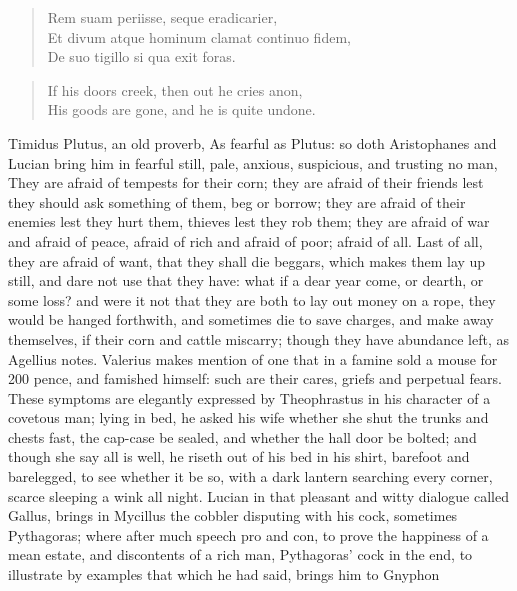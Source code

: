 {\begin{verse}
\textlatin{Rem suam periisse, seque eradicarier},\\
\textlatin{Et divum atque hominum clamat continuo fidem},\\
\textlatin{De suo tigillo si qua exit foras}.
\end{verse}

\begin{verse}
If his doors creek, then out he cries anon,\\
His goods are gone, and he is quite undone.
\end{verse}

Timidus Plutus, an old proverb, As fearful as Plutus: so doth
Aristophanes and Lucian bring him in fearful still, pale, anxious,
suspicious, and trusting no man, They are afraid of tempests for
their corn; they are afraid of their friends lest they should ask
something of them, beg or borrow; they are afraid of their enemies lest
they hurt them, thieves lest they rob them; they are afraid of war and
afraid of peace, afraid of rich and afraid of poor; afraid of all. Last
of all, they are afraid of want, that they shall die beggars, which
makes them lay up still, and dare not use that they have: what if a
dear year come, or dearth, or some loss? and were it not that they are
both to lay out money on a rope, they would be hanged forthwith,
and sometimes die to save charges, and make away themselves, if their
corn and cattle miscarry; though they have abundance left, as
Agellius notes. Valerius makes mention of one that in a
famine sold a mouse for 200 pence, and famished himself: such are their
cares, griefs and perpetual fears. These symptoms are elegantly
expressed by Theophrastus in his character of a covetous man;
lying in bed, he asked his wife whether she shut the trunks and
chests fast, the cap-case be sealed, and whether the hall door be
bolted; and though she say all is well, he riseth out of his bed in his
shirt, barefoot and barelegged, to see whether it be so, with a dark
lantern searching every corner, scarce sleeping a wink all night.
Lucian in that pleasant and witty dialogue called Gallus, brings in
Mycillus the cobbler disputing with his cock, sometimes Pythagoras;
where after much speech pro and con, to prove the happiness of a mean
estate, and discontents of a rich man, Pythagoras' cock in the end, to
illustrate by examples that which he had said, brings him to Gnyphon
}
